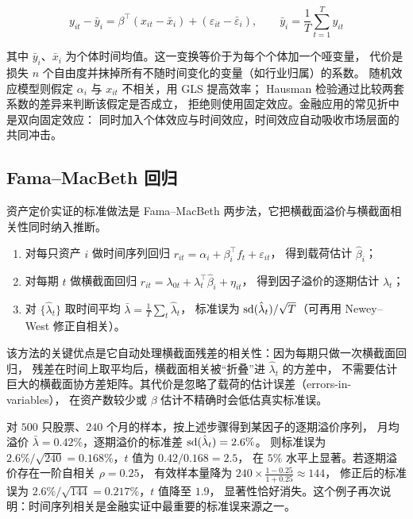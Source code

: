 \begin{equation}
  y_{it} - \bar{y}_i = \beta^{\top}\left(x_{it} - \bar{x}_i\right) + \left(\varepsilon_{it} - \bar{\varepsilon}_i\right),
  \qquad \bar{y}_i = \frac{1}{T}\sum_{t=1}^{T} y_{it}
  \label{eq:08-within}
\end{equation}

其中 $\bar{y}_i$、$\bar{x}_i$ 为个体时间均值。这一变换等价于为每个个体加一个哑变量，
代价是损失 $n$ 个自由度并抹掉所有不随时间变化的变量（如行业归属）的系数。
随机效应模型则假定 $\alpha_i$ 与 $x_{it}$ 不相关，用 GLS 提高效率；
Hausman 检验通过比较两套系数的差异来判断该假定是否成立，
拒绝则使用固定效应。金融应用的常见折中是双向固定效应：
同时加入个体效应与时间效应，时间效应自动吸收市场层面的共同冲击。

\subsection{Fama--MacBeth 回归}

资产定价实证的标准做法是 Fama--MacBeth 两步法，它把横截面溢价与横截面相关性同时纳入推断。

\begin{enumerate}[leftmargin=*]
  \item 对每只资产 $i$ 做时间序列回归 $r_{it} = \alpha_i + \beta_i^{\top} f_t + \varepsilon_{it}$，
  得到载荷估计 $\hat{\beta}_i$；
  \item 对每期 $t$ 做横截面回归 $r_{it} = \lambda_{0t} + \lambda_t^{\top}\hat{\beta}_i + \eta_{it}$，
  得到因子溢价的逐期估计 $\hat{\lambda}_t$；
  \item 对 $\{\hat{\lambda}_t\}$ 取时间平均 $\bar{\lambda} = \frac{1}{T}\sum_t \hat{\lambda}_t$，
  标准误为 $\operatorname{sd}(\hat{\lambda}_t)/\sqrt{T}$（可再用 Newey--West 修正自相关）。
\end{enumerate}

该方法的关键优点是它自动处理横截面残差的相关性：因为每期只做一次横截面回归，
残差在时间上取平均后，横截面相关被“折叠”进 $\hat{\lambda}_t$ 的方差中，
不需要估计巨大的横截面协方差矩阵。其代价是忽略了载荷的估计误差（errors-in-variables），
在资产数较少或 $\beta$ 估计不精确时会低估真实标准误。

\begin{example}\label{ex:08-fm}
对 $500$ 只股票、$240$ 个月的样本，按上述步骤得到某因子的逐期溢价序列，
月均溢价 $\bar{\lambda} = 0.42\%$，逐期溢价的标准差 $\operatorname{sd}(\hat{\lambda}_t) = 2.6\%$。
则标准误为 $2.6\%/\sqrt{240} = 0.168\%$，$t$ 值为 $0.42/0.168 = 2.5$，
在 $5\%$ 水平上显著。若逐期溢价存在一阶自相关 $\rho = 0.25$，
有效样本量降为 $240 \times \frac{1-0.25}{1+0.25} \approx 144$，
修正后的标准误为 $2.6\%/\sqrt{144} = 0.217\%$，$t$ 值降至 $1.9$，
显著性恰好消失。这个例子再次说明：时间序列相关是金融实证中最重要的标准误来源之一。
\end{example}

